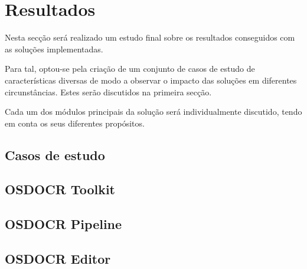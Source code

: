 \chapter{Resultados}
\label{cap_results}

Nesta secção será realizado um estudo final sobre os resultados conseguidos com as soluções implementadas. 

Para tal, optou-se pela criação de um conjunto de casos de estudo de características diversas de modo a observar o impacto das soluções em diferentes circunstâncias. Estes serão discutidos na primeira secção.

Cada um dos módulos principais da solução será individualmente discutido, tendo em conta os seus diferentes propósitos.


\section{Casos de estudo}


\section{OSDOCR Toolkit}



\section{OSDOCR Pipeline}



\section{OSDOCR Editor}


